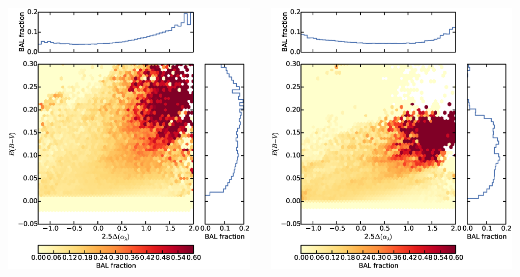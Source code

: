 \documentclass[landscape,9pt]{beamer}
\begin{document}
\begin{frame}
	\begin{columns}
		\begin{column}{0.4\textwidth}
			\includegraphics[width=\textwidth]{../images/Dust/f11a}
		\end{column}
		\begin{column}{0.4\textwidth}
			\includegraphics[width=\textwidth]{../images/Dust/f11b}

\end{column}
\end{columns}
\end{frame}
\end{document}
